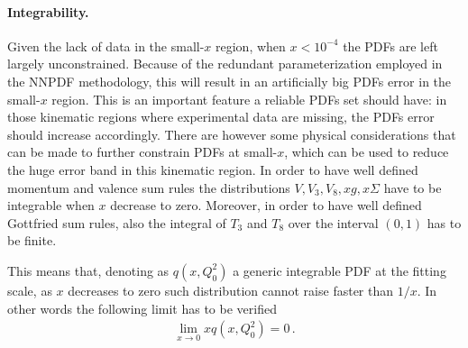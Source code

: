 \paragraph{Integrability.}
Given the lack of data in the small-$x$ region, when $x<10^{-4}$ the PDFs are left largely unconstrained. 
Because of the redundant parameterization employed in the NNPDF methodology, this will result in 
an artificially big PDFs error in the small-$x$ region.
This is an important feature a reliable PDFs set should have: in those kinematic regions where experimental data
are missing, the PDFs error should increase accordingly.
There are however some physical considerations that can be made to further constrain PDFs at small-$x$, 
which can be used to reduce the huge error band in this kinematic region. 
In order to have well defined momentum and valence sum rules the distributions $V, V_3, V_8, xg, x\Sigma$ 
have to be integrable when $x$ decrease to zero.
Moreover, in order to have well defined Gottfried sum rules, also the integral of $T_3$ and $T_8$ over the interval
$\left(0,1\right)$ has to be finite. 

This means that, denoting as $q\left(x,Q_0^2\right)$ a generic integrable PDF at the fitting scale, as $x$ decreases to zero
such distribution cannot raise faster than $1/x$. In other words the following limit has to be verified
\begin{align}
    \label{eq:integrability}
    \lim_{x\rightarrow 0} xq\left(x,Q_0^2\right) = 0\,.
\end{align}

